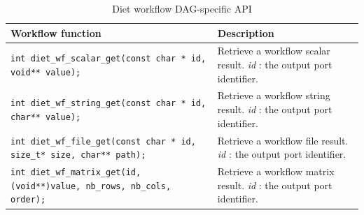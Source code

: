 \begin{itemize}
\begin{table}[htbp]
  \centering
  \begin{tabular}[htbp]{|p{8cm}|p{7.5cm}|}\hline
    Workflow function & Description \\\hline
    \texttt{int   \newline
      diet\_wf\_scalar\_get(const char * id, void** value);}
    &
    Retrieve a workflow scalar result. \newline
    \textit{id} : the output port identifier.
    \\\hline
    \texttt{int   \newline
      diet\_wf\_string\_get(const char * id, char** value);}
    &
    Retrieve a workflow string result. \newline
    \textit{id} : the output port identifier.
    \\\hline
    \texttt{int    \newline
      diet\_wf\_file\_get(const char * id, size\_t* size, char** path);}
    &
    Retrieve a workflow file result. \newline
    \textit{id} : the output port identifier.
    \\\hline
    \texttt{int    \newline
      diet\_wf\_matrix\_get(id, (void**)value, nb\_rows, nb\_cols, order);}
    &
    Retrieve a workflow matrix result. \newline
    \textit{id} : the output port identifier.
    \\\hline
  \end{tabular}
  \caption{Diet workflow DAG-specific API}
  \label{tab::wf_dag_api}
\end{table}


\end{itemize}
